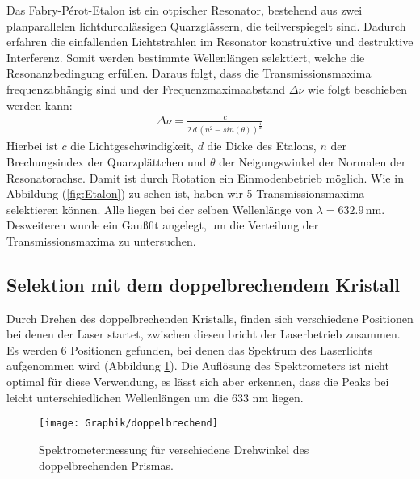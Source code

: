 \documentclass[10pt,twoside]{article}
\renewcommand{\1}{^{-1}}
\renewcommand{\2}{^{-2}}
\newcommand{\3}{^{-3}}
\newcommand{\4}{^{-4}}
\newcommand{\5}{^{-5}}
\newcommand{\6}{^{-6}}
\newcommand{\7}{^{-7}}
\newcommand{\8}{^{-8}}
\newcommand{\9}{^{-9}}
\begin{document}
Das Fabry-Pérot-Etalon ist ein otpischer Resonator, bestehend aus zwei planparallelen lichtdurchlässigen Quarzglässern, die teilverspiegelt sind. Dadurch erfahren die einfallenden Lichtstrahlen im Resonator konstruktive und destruktive Interferenz. Somit werden bestimmte Wellenlängen selektiert, welche die Resonanzbedingung erfüllen. Daraus folgt, dass die Transmissionsmaxima frequenzabhängig sind und der Frequenzmaximaabstand $\Delta \nu$ wie folgt beschieben werden kann:
\begin{align*}
\Delta \nu = \frac{c}{2\,d\,\left(n^2 -sin(\theta)\right)^{\frac{1}{2}}}
\end{align*}
Hierbei ist $c$ die Lichtgeschwindigkeit, $d$ die Dicke des Etalons, $n$ der Brechungsindex der Quarzplättchen und $\theta$ der Neigungswinkel der Normalen der Resonatorachse. Damit ist durch Rotation ein Einmodenbetrieb möglich. Wie in Abbildung (\ref{fig:Etalon}) zu sehen ist, haben wir 5 Transmissionsmaxima selektieren können. Alle liegen bei der selben Wellenlänge von $\lambda=632.9\,\text{nm}$. Desweiteren wurde ein Gaußfit angelegt, um die Verteilung der Transmissionsmaxima zu untersuchen.



\subsection{Selektion mit dem doppelbrechendem Kristall}

Durch Drehen des doppelbrechenden Kristalls, finden sich verschiedene Positionen bei denen der Laser startet, zwischen diesen bricht der Laserbetrieb zusammen.
Es werden 6 Positionen gefunden, bei denen das Spektrum des Laserlichts aufgenommen wird (Abbildung \ref{fig:prisma}). Die Auflösung des Spektrometers ist nicht optimal für diese Verwendung, es lässt sich aber erkennen, dass die Peaks bei leicht unterschiedlichen Wellenlängen um die 633 nm liegen.

\begin{figure}[H]
\centering
\texttt{[image: Graphik/doppelbrechend]} 
\caption{Spektrometermessung für verschiedene Drehwinkel des doppelbrechenden Prismas.}
\label{fig:prisma}
\end{figure}

\end{document}
